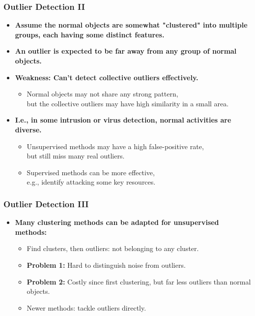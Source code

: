\begin{frame}
	\frametitle{Outlier Detection II}
	\begin{itemize}
		\item \textbf{Assume the {\color{airforceblue}normal objects are somewhat "clustered"} into multiple groups, each having some distinct features.}
		      \item\textbf{An outlier is expected to be {\color{airforceblue}far away from any group} of normal objects.}
		\item \textbf{Weakness: Can't detect collective outliers effectively.}
		      \begin{itemize}
			      \item Normal objects may not share any strong pattern, \\
			            but the collective outliers may have high similarity in a small area.
		      \end{itemize}
		\item \textbf{I.e., in some intrusion or virus detection, normal activities are diverse.}
		      \begin{itemize}
			      \item Unsupervised methods may have a high false-positive rate, \\
			            but still miss many real outliers.
			      \item Supervised methods can be more effective, \\
			            e.g., identify attacking some key resources.
		      \end{itemize}
	\end{itemize}
\end{frame}


\begin{frame}
	\frametitle{Outlier Detection III}
	\begin{itemize}
		\item \textbf{Many clustering methods can be adapted for unsupervised methods:}
		      \begin{itemize}
			      \item Find clusters, then outliers: not belonging to any cluster.
			      \item \textbf{Problem 1:} Hard to distinguish noise from outliers.
			      \item \textbf{Problem 2:} Costly since first clustering, but far less outliers than normal objects.
			      \item Newer methods: tackle outliers directly.
		      \end{itemize}
	\end{itemize}
\end{frame}


